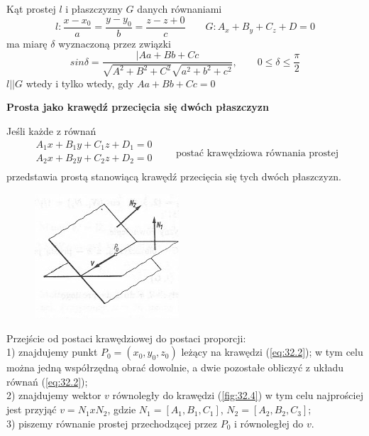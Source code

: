 \begin{przyklad}{32.6} Kąt prostej $l$ i płaszczyzny $G$ danych równaniami
\begin{equation}
	l: \frac{x-x_0}{a} = \frac{y-y_0}{b} = \frac{z-z+0}{c} \qquad G: A_x+B_y+C_z+D=0 \nonumber
\end{equation}
ma miarę $\delta$ wyznaczoną przez związki
\begin{equation}
	sin\delta= \frac{|Aa+Bb+Cc}{\sqrt{A^2+B^2+C^2}\sqrt{a^2+b^2+c^2}}, \qquad 0\leq\delta\leq\frac{\pi}{2}
	\label{eq:32.1}
\end{equation}
$l||G$ wtedy i tylko wtedy, gdy $Aa+Bb+Cc=0$
\end{przyklad}
\textbf{Prosta jako krawędź przecięcia się dwóch płaszczyzn}
\begin{pkt}{32.1}
Jeśli każde z równań
\begin{equation}
	\begin{matrix}
	A_1x+B_1y+C_1z+D_1=0\\
	A_2x+B_2y+C_2z+D_2=0\\
	\end{matrix}
	\qquad \textrm{postać krawędziowa równania prostej}
	\label{eq:32.2}
\end{equation}
przedstawia prostą stanowiącą krawędź przecięcia się tych dwóch płaszczyzn.

\begin{figure}[ht]
	\centering
		\includegraphics{rys/32_4.png}
	\caption{ }
	\label{fig:31.3}
\end{figure}

Przejście od postaci krawędziowej do postaci proporcji:\\
1) znajdujemy punkt $P_0=(x_0,y_0,z_0)$ leżący na krawędzi (\ref{eq:32.2}); w tym celu można jedną współrzędną obrać dowolnie, a dwie pozostałe obliczyć z układu równań (\ref{eq:32.2});\\
2) znajdujemy wektor $v$ równoległy do krawędzi (\ref{fig:32.4}) w tym celu najprościej jest przyjąć $v= N_1xN_2$, gdzie $N_1=[A_1,B_1,C_1]$, $N_2=[A_2,B_2,C_3]$;\\
3) piszemy równanie prostej przechodzącej przez $P_0$ i równoległej do $v$.
\end{pkt}
